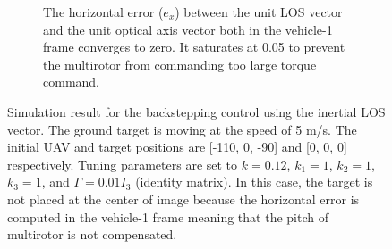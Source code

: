 \begin{figure}[htbp]
\begin{subfigure}[t]{0.8\linewidth}
		\caption{The horizontal error ($e_x$) between the unit LOS vector and the unit optical axis vector both in the vehicle-1 frame converges to zero. It saturates at 0.05 to prevent the multirotor from commanding too large torque command.}
	\end{subfigure}	
	\caption[Simulation result for the backstepping control using the inertial LOS vector.]{Simulation result for the backstepping control using the inertial LOS vector. The ground target is moving at the speed of 5 m/s. The initial UAV and target positions are [-110, 0, -90] and [0, 0, 0] respectively. Tuning parameters are set to $k=0.12$, $k_1=1$, $k_2=1$, $k_3=1$, and $\Gamma=0.01I_3$ (identity matrix). In this case, the target is not placed at the center of image because the horizontal error is computed in the vehicle-1 frame meaning that the pitch of multirotor is not compensated.}
	\label{inertial_5mps}
\end{figure}


